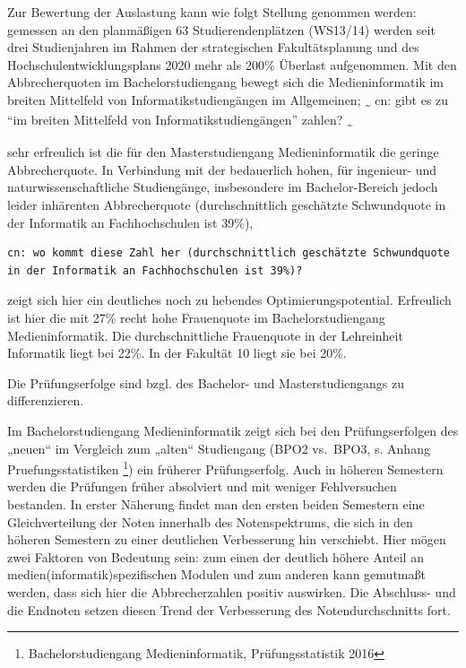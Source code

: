 Zur Bewertung der Auslastung kann wie folgt Stellung genommen werden:
gemessen an den planmäßigen 63 Studierendenplätzen (WS13/14) werden seit
drei Studienjahren im Rahmen der strategischen Fakultätsplanung und des
Hochschulentwicklungsplans 2020 mehr als 200\% Überlast aufgenommen. Mit
den Abbrecherquoten im Bachelorstudiengang bewegt sich die
Medieninformatik im breiten Mittelfeld von Informatikstudiengängen im
Allgemeinen; \textsubscript{\textasciitilde{}} cn: gibt es zu ``im
breiten Mittelfeld von Informatikstudiengängen'' zahlen?
\textsubscript{\textasciitilde{}}

sehr erfreulich ist die für den Masterstudiengang Medieninformatik die
geringe Abbrecherquote. In Verbindung mit der bedauerlich hohen, für
ingenieur- und naturwissenschaftliche Studiengänge, insbesondere im
Bachelor-Bereich jedoch leider inhärenten Abbrecherquote
(durchschnittlich geschätzte Schwundquote in der Informatik an
Fachhochschulen ist 39\%),

\begin{verbatim}
cn: wo kommt diese Zahl her (durchschnittlich geschätzte Schwundquote in der Informatik an Fachhochschulen ist 39%)?
\end{verbatim}

zeigt sich hier ein deutliches noch zu hebendes Optimierungspotential.
Erfreulich ist hier die mit 27\% recht hohe Frauenquote im
Bachelorstudiengang Medieninformatik. Die durchschnittliche Frauenquote
in der Lehreinheit Informatik liegt bei 22\%. In der Fakultät 10 liegt
sie bei 20\%.

Die Prüfungserfolge sind bzgl. des Bachelor- und Masterstudiengangs zu
differenzieren.

Im Bachelorstudiengang Medieninformatik zeigt sich bei den
Prüfungserfolgen des „neuen`` im Vergleich zum „alten`` Studiengang
(BPO2 vs.~BPO3, s. Anhang Pruefungsstatistiken \footnote{Bachelorstudiengang
  Medieninformatik, Prüfungsstatistik 2016}) ein früherer
Prüfungserfolg. Auch in höheren Semestern werden die Prüfungen früher
absolviert und mit weniger Fehlversuchen bestanden. In erster Näherung
findet man den ersten beiden Semestern eine Gleichverteilung der Noten
innerhalb des Notenspektrums, die sich in den höheren Semestern zu einer
deutlichen Verbesserung hin verschiebt. Hier mögen zwei Faktoren von
Bedeutung sein: zum einen der deutlich höhere Anteil an
medien(informatik)spezifischen Modulen und zum anderen kann gemutmaßt
werden, dass sich hier die Abbrecherzahlen positiv auswirken. Die
Abschluss- und die Endnoten setzen diesen Trend der Verbesserung des
Notendurchschnitts fort.

